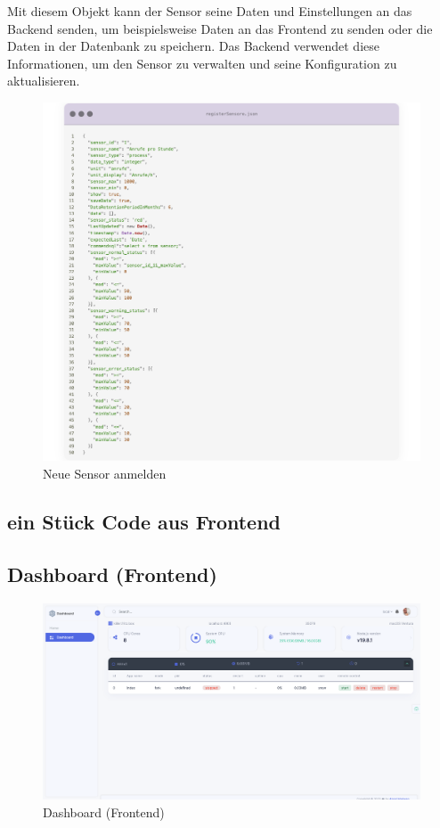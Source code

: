 Mit diesem Objekt kann der Sensor seine Daten und Einstellungen an das Backend senden, um beispielsweise Daten an das Frontend zu senden oder die Daten in der Datenbank zu speichern. Das Backend verwendet diese Informationen, um den Sensor zu verwalten und seine Konfiguration zu aktualisieren.
\begin{figure}[h]
	\centering
	\includegraphics[width=1\textwidth]{img/registerSensore.png}
	\caption{Neue Sensor anmelden}
	\label{fig:example}
\end{figure}
\clearpage




\subsection{ein Stück Code aus Frontend}\label{appendix:a9}\par

	\clearpage

\subsection{Dashboard (Frontend)}\label{appendix:a6}\par
\begin{figure}[htbp]
	\centering
	\includegraphics[width=1\textwidth]{img/dashboard.png}
	\caption{Dashboard (Frontend)}
	\label{fig:example}
	\label{Login-Seite}
\end{figure}
	\par\newpage
